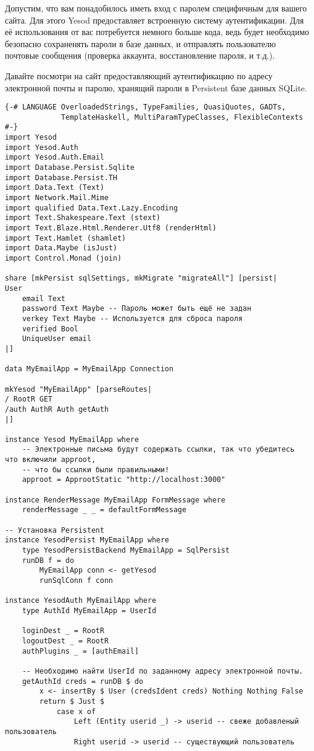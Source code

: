 Допустим, что вам понадобилось иметь вход с паролем специфичным для вашего сайта. Для этого Yesod предоставляет встроенную систему аутентификации. Для её использования от вас потребуется немного больше кода, ведь будет необходимо безопасно сохраненять пароли в базе данных, и отправлять пользователю почтовые сообщения (проверка аккаунта, восстановление пароля, и т.д.).

Давайте посмотри на сайт предоставляющий аутентификацию по адресу электронной почты и паролю, хранящий пароли в Persistent базе данных SQLite.

\begin{lstlisting}
{-# LANGUAGE OverloadedStrings, TypeFamilies, QuasiQuotes, GADTs,
             TemplateHaskell, MultiParamTypeClasses, FlexibleContexts #-}
import Yesod
import Yesod.Auth
import Yesod.Auth.Email
import Database.Persist.Sqlite
import Database.Persist.TH
import Data.Text (Text)
import Network.Mail.Mime
import qualified Data.Text.Lazy.Encoding
import Text.Shakespeare.Text (stext)
import Text.Blaze.Html.Renderer.Utf8 (renderHtml)
import Text.Hamlet (shamlet)
import Data.Maybe (isJust)
import Control.Monad (join)

share [mkPersist sqlSettings, mkMigrate "migrateAll"] [persist|
User
    email Text
    password Text Maybe -- Пароль может быть ещё не задан
    verkey Text Maybe -- Используется для сброса пароля
    verified Bool
    UniqueUser email
|]

data MyEmailApp = MyEmailApp Connection

mkYesod "MyEmailApp" [parseRoutes|
/ RootR GET
/auth AuthR Auth getAuth
|]

instance Yesod MyEmailApp where
    -- Электронные письма будут содержать ссылки, так что убедитесь что включили approot, 
    -- что бы ссылки были правильными!
    approot = ApprootStatic "http://localhost:3000"

instance RenderMessage MyEmailApp FormMessage where
    renderMessage _ _ = defaultFormMessage

-- Установка Persistent
instance YesodPersist MyEmailApp where
    type YesodPersistBackend MyEmailApp = SqlPersist
    runDB f = do
        MyEmailApp conn <- getYesod
        runSqlConn f conn

instance YesodAuth MyEmailApp where
    type AuthId MyEmailApp = UserId

    loginDest _ = RootR
    logoutDest _ = RootR
    authPlugins _ = [authEmail]

    -- Необходимо найти UserId по заданному адресу электронной почты.
    getAuthId creds = runDB $ do
        x <- insertBy $ User (credsIdent creds) Nothing Nothing False
        return $ Just $
            case x of
                Left (Entity userid _) -> userid -- свеже добавленый пользователь
                Right userid -> userid -- существующий пользователь


\end{lstlisting}
